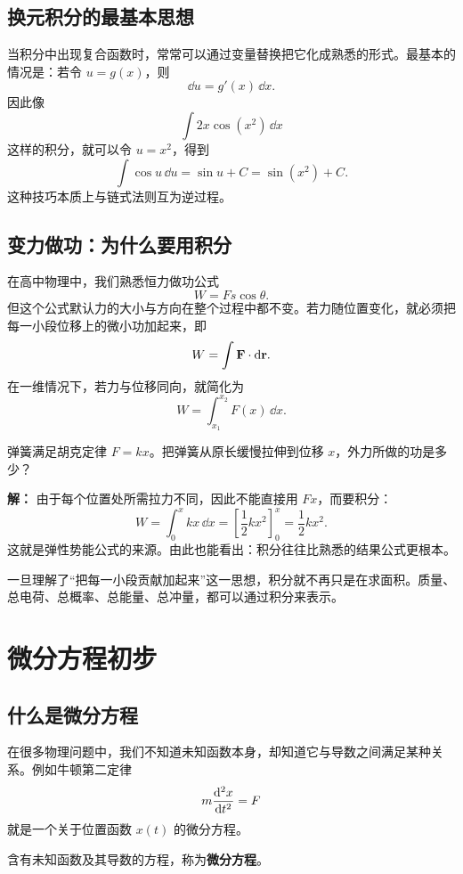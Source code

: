 \subsection{换元积分的最基本思想}

当积分中出现复合函数时，常常可以通过变量替换把它化成熟悉的形式。最基本的情况是：若令 $u=g(x)$，则
\[
  \dd u = g'(x)\,\dd x.
\]
因此像
\[
  \int 2x\cos(x^2)\,\dd x
\]
这样的积分，就可以令 $u=x^2$，得到
\[
  \int \cos u\,\dd u = \sin u + C = \sin(x^2)+C.
\]
这种技巧本质上与链式法则互为逆过程。

\subsection{变力做功：为什么要用积分}

在高中物理中，我们熟悉恒力做功公式
\[
  W = Fs\cos\theta.
\]
但这个公式默认力的大小与方向在整个过程中都不变。若力随位置变化，就必须把每一小段位移上的微小功加起来，即
\[
  W = \int \vb{F}\cdot \dd\vb{r}.
\]
在一维情况下，若力与位移同向，就简化为
\[
  W = \int_{x_1}^{x_2} F(x)\,\dd x.
\]

\begin{example}
弹簧满足胡克定律 $F=kx$。把弹簧从原长缓慢拉伸到位移 $x$，外力所做的功是多少？

\textbf{解：} 由于每个位置处所需拉力不同，因此不能直接用 $Fx$，而要积分：
\[
  W = \int_0^x kx\,\dd x = \left[\frac12 kx^2\right]_0^x = \frac12 kx^2.
\]
这就是弹性势能公式的来源。由此也能看出：积分往往比熟悉的结果公式更根本。
\end{example}

\begin{remark}
一旦理解了“把每一小段贡献加起来”这一思想，积分就不再只是在求面积。质量、总电荷、总概率、总能量、总冲量，都可以通过积分来表示。
\end{remark}

\section{微分方程初步}

\subsection{什么是微分方程}

在很多物理问题中，我们不知道未知函数本身，却知道它与导数之间满足某种关系。例如牛顿第二定律
\[
  m\dv[2]{x}{t}=F
\]
就是一个关于位置函数 $x(t)$ 的微分方程。

\begin{definition}
含有未知函数及其导数的方程，称为\textbf{微分方程}。
\end{definition}


